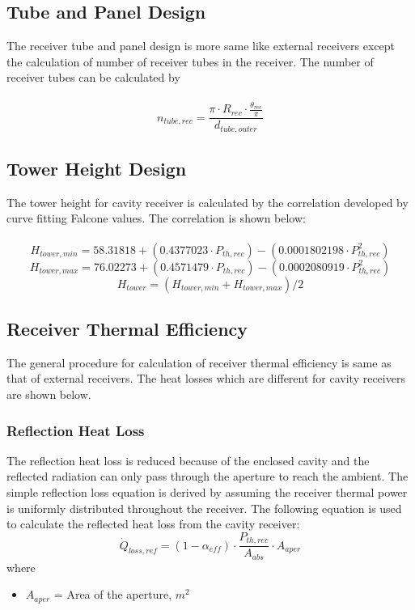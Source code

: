 \subsection{Tube and Panel Design}
The receiver tube and panel design is more same like external receivers except the calculation of number of receiver tubes in the receiver. The number of receiver tubes can be calculated by\\\\
\begin{equation}
n_{tube,rec} = \frac{\pi \cdot R_{rec} \cdot \frac{\theta_{rec}}{\pi}}{d_{tube,outer}}
\end{equation}
\subsection{Tower Height Design}
The tower height for cavity receiver is calculated by the correlation developed by curve fitting Falcone values. The correlation is shown below:\\\\
\begin{equation}
	H_{tower,min} = 58.31818 + (0.4377023 \cdot P_{th,rec}) - (0.0001802198 \cdot P_{th,rec}^2)
\end{equation}        
\begin{equation}
	H_{tower,max}= 76.02273 + (0.4571479 \cdot P_{th,rec}) - (0.0002080919 \cdot P_{th,rec}^2)
\end{equation}
\begin{equation}
	H_{tower} = (H_{tower,min} + H_{tower,max}) / 2
\end{equation}
\subsection{Receiver Thermal Efficiency}
The general procedure for calculation of receiver thermal efficiency is same as that of external receivers. The heat losses which are different for cavity receivers are shown below.
\subsubsection{Reflection Heat Loss}
The reflection heat loss is reduced because of the enclosed cavity and the reflected radiation can only pass through the aperture to reach the ambient. The simple reflection loss equation is derived by assuming the receiver thermal power is uniformly distributed throughout the receiver. The following equation is used to calculate the reflected heat loss from the cavity receiver:
\begin{equation}
	\dot Q_{loss,ref}=(1-\alpha_{eff})\cdot \frac{P_{th,rec}}{A_{abs}} \cdot A_{aper}
\end{equation}
where 
\begin{itemize}
   \item $A_{aper}$ = Area of the aperture, $m^2$
\end{itemize}
